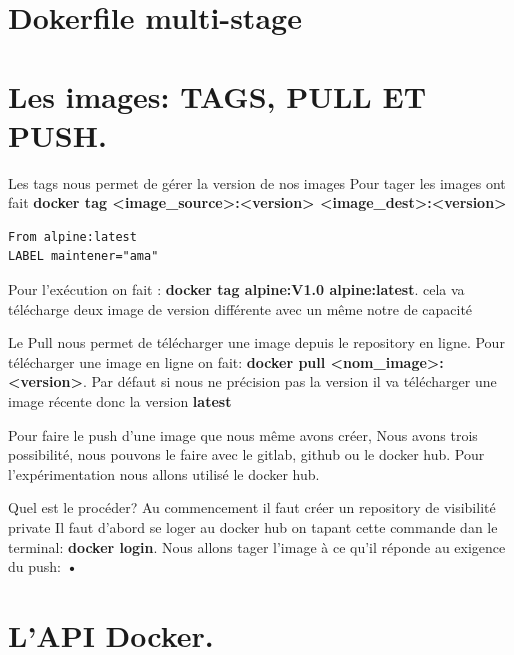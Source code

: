 \documentclass[12pt,a4paper]{article}
\begin{document}
\section{Dokerfile multi-stage}


\section{Les images: TAGS, PULL ET PUSH.}
Les tags nous permet de gérer la version de nos images
Pour tager les images ont fait \textbf{docker tag <image\_source>:<version> <image\_dest>:<version>}

\begin{verbatim}
From alpine:latest
LABEL maintener="ama"
\end{verbatim}
Pour l'exécution on fait : \textbf{docker tag alpine:V1.0 alpine:latest}. cela va télécharge deux image de version différente avec un même notre de capacité

Le Pull nous permet de télécharger une image depuis le repository en ligne. Pour télécharger une image en ligne on fait: \textbf{docker pull <nom\_image>:<version>}. Par défaut si nous ne précision pas la version il va télécharger une image récente donc la version \textbf{latest}

Pour faire le push d'une image que nous même avons créer, Nous avons trois possibilité, nous pouvons le faire avec le gitlab, github ou le docker hub.
Pour l'expérimentation nous allons utilisé le docker hub.

Quel est le procéder?
Au commencement il faut créer un repository de visibilité private
Il faut d'abord se loger au docker hub on tapant cette commande dan le terminal: \textbf{docker login}. Nous allons tager l'image à ce qu'il réponde au exigence du push: \textbf{•}


\section{L'API Docker.}
\end{document}
